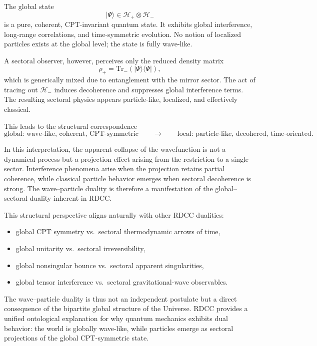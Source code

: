 \documentclass[11pt,a4paper]{article}
\begin{document}
The global state
\begin{equation}
    |\Psi\rangle \in \mathcal{H}_+ \otimes \mathcal{H}_-
\end{equation}
is a pure, coherent, CPT-invariant quantum state. It exhibits global interference, long-range
correlations, and time-symmetric evolution. No notion of localized particles exists at the global
level; the state is fully wave-like.

A sectoral observer, however, perceives only the reduced density matrix
\begin{equation}
    \rho_+ = \mathrm{Tr}_{-} \left( |\Psi\rangle\langle\Psi| \right),
\end{equation}
which is generically mixed due to entanglement with the mirror sector. The act of tracing out
$\mathcal{H}_-$ induces decoherence and suppresses global interference terms. The resulting
sectoral physics appears particle-like, localized, and effectively classical.

This leads to the structural correspondence
\begin{equation}
    \text{global: wave-like, coherent, CPT-symmetric}
    \qquad\longrightarrow\qquad
    \text{local: particle-like, decohered, time-oriented}.
\end{equation}

In this interpretation, the apparent collapse of the wavefunction is not a dynamical process but
a projection effect arising from the restriction to a single sector. Interference phenomena arise
when the projection retains partial coherence, while classical particle behavior emerges when
sectoral decoherence is strong. The wave–particle duality is therefore a manifestation of the
global–sectoral duality inherent in RDCC.

This structural perspective aligns naturally with other RDCC dualities:
\begin{itemize}
    \item global CPT symmetry vs.\ sectoral thermodynamic arrows of time,
    \item global unitarity vs.\ sectoral irreversibility,
    \item global nonsingular bounce vs.\ sectoral apparent singularities,
    \item global tensor interference vs.\ sectoral gravitational-wave observables.
\end{itemize}

The wave–particle duality is thus not an independent postulate but a direct consequence of the
bipartite global structure of the Universe. RDCC provides a unified ontological explanation for
why quantum mechanics exhibits dual behavior: the world is globally wave-like, while particles
emerge as sectoral projections of the global CPT-symmetric state.
\end{document}

